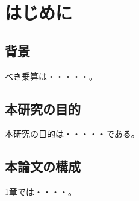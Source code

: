 
\section{はじめに}

\subsection{背景}

べき乗算は・・・・・。\cite{bernstein2002pippenger}

\subsection{本研究の目的}

本研究の目的は・・・・・である。

\subsection{本論文の構成}

1章では・・・・。